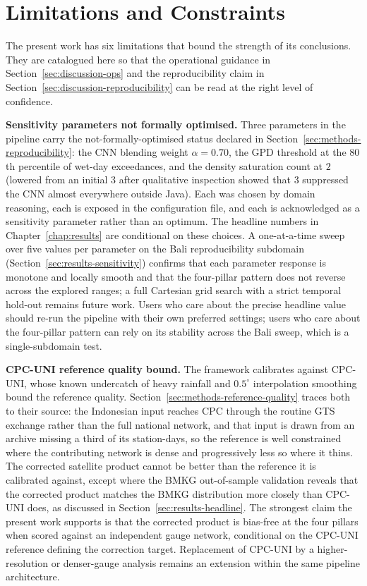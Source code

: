 \section{Limitations and Constraints}\label{sec:discussion-limitations}

The present work has six limitations that bound the strength of
its conclusions. They are catalogued here so that the
operational guidance in Section~\ref{sec:discussion-ops} and the
reproducibility claim in
Section~\ref{sec:discussion-reproducibility} can be read at the
right level of confidence.

\textbf{Sensitivity parameters not formally optimised.} Three
parameters in the pipeline carry the not-formally-optimised
status declared in Section~\ref{sec:methods-reproducibility}: the
CNN blending weight $\alpha = 0.70$, the GPD threshold at the
$80$th percentile of wet-day exceedances, and the density
saturation count at $2$ (lowered from an initial $3$ after
qualitative inspection showed that $3$ suppressed the CNN almost
everywhere outside Java). Each was chosen by domain reasoning,
each is exposed in the configuration file, and each is acknowledged
as a sensitivity parameter rather than an optimum. The headline
numbers in Chapter~\ref{chap:results} are conditional on these
choices. A one-at-a-time sweep over five values per parameter on
the Bali reproducibility subdomain
(Section~\ref{sec:results-sensitivity}) confirms that each
parameter response is monotone and locally smooth and that the
four-pillar pattern does not reverse across the explored ranges; a
full Cartesian grid search with a strict temporal hold-out remains
future work. Users who care about the precise headline value
should re-run the pipeline with their own preferred settings;
users who care about the four-pillar pattern can rely on its
stability across the Bali sweep, which is a single-subdomain test.

\textbf{CPC-UNI reference quality bound.} The framework
calibrates against CPC-UNI, whose known undercatch of heavy
rainfall and $0.5^{\circ}$ interpolation smoothing bound the
reference quality. Section~\ref{sec:methods-reference-quality}
traces both to their source: the Indonesian input reaches CPC
through the routine GTS exchange rather than the full national
network, and that input is drawn from an archive missing a third
of its station-days, so the reference is well constrained where
the contributing network is dense and progressively less so where
it thins. The
corrected satellite product cannot be
better than the reference it is calibrated against, except where
the BMKG out-of-sample validation reveals that the corrected
product matches the BMKG distribution more closely than CPC-UNI
does, as discussed in Section~\ref{sec:results-headline}. The
strongest claim the present work supports is that the corrected
product is bias-free at the four pillars when scored against an
independent gauge network, conditional on the CPC-UNI reference
defining the correction target. Replacement of CPC-UNI by a
higher-resolution or denser-gauge analysis remains an extension
within the same pipeline architecture.

